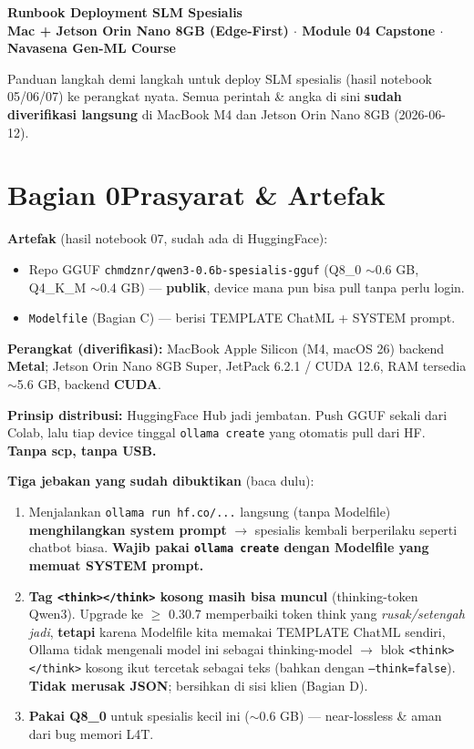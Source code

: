 \documentclass[11pt,a4paper]{article}
\begin{document}
\thispagestyle{fancy}

\noindent\begin{tcolorbox}[colback=nvgreen,colframe=nvgreen,arc=4pt,left=12pt,right=12pt,top=8pt,bottom=8pt]
\color{white}\LARGE\bfseries Runbook Deployment SLM Spesialis\\[3pt]
\normalsize\mdseries Mac + Jetson Orin Nano 8GB (Edge-First) $\cdot$ Module 04 Capstone $\cdot$ Navasena Gen-ML Course
\end{tcolorbox}

\vspace{4pt}
\noindent Panduan langkah demi langkah untuk deploy SLM spesialis (hasil notebook 05/06/07) ke perangkat nyata. Semua perintah \& angka di sini \textbf{sudah diverifikasi langsung} di MacBook M4 dan Jetson Orin Nano 8GB (2026-06-12).

\section*{\color{nvgreen}Bagian 0\quad Prasyarat \& Artefak}
\textbf{Artefak} (hasil notebook 07, sudah ada di HuggingFace):
\begin{itemize}
  \item Repo GGUF \texttt{chmdznr/qwen3-0.6b-spesialis-gguf} (Q8\_0 $\sim$0.6 GB, Q4\_K\_M $\sim$0.4 GB) --- \textbf{publik}, device mana pun bisa pull tanpa perlu login.
  \item \texttt{Modelfile} (Bagian C) --- berisi TEMPLATE ChatML + SYSTEM prompt.
\end{itemize}
\textbf{Perangkat (diverifikasi):} MacBook Apple Silicon (M4, macOS 26) backend \textbf{Metal}; Jetson Orin Nano 8GB Super, JetPack 6.2.1 / CUDA 12.6, RAM tersedia $\sim$5.6 GB, backend \textbf{CUDA}.

\textbf{Prinsip distribusi:} HuggingFace Hub jadi jembatan. Push GGUF sekali dari Colab, lalu tiap device tinggal \texttt{ollama create} yang otomatis pull dari HF. \textbf{Tanpa scp, tanpa USB.}

\begin{warn}
\textbf{Tiga jebakan yang sudah dibuktikan} (baca dulu):
\begin{enumerate}[leftmargin=1.6em]
  \item Menjalankan \texttt{ollama run hf.co/...} langsung (tanpa Modelfile) \textbf{menghilangkan system prompt} $\to$ spesialis kembali berperilaku seperti chatbot biasa. \textbf{Wajib pakai \texttt{ollama create} dengan Modelfile yang memuat SYSTEM prompt.}
  \item \textbf{Tag \texttt{<think></think>} kosong masih bisa muncul} (thinking-token Qwen3). Upgrade ke $\geq$ 0.30.7 memperbaiki token think yang \emph{rusak/setengah jadi}, \textbf{tetapi} karena Modelfile kita memakai TEMPLATE ChatML sendiri, Ollama tidak mengenali model ini sebagai thinking-model $\to$ blok \texttt{<think></think>} kosong ikut tercetak sebagai teks (bahkan dengan \texttt{--think=false}). \textbf{Tidak merusak JSON}; bersihkan di sisi klien (Bagian D).
  \item \textbf{Pakai Q8\_0} untuk spesialis kecil ini ($\sim$0.6 GB) --- near-lossless \& aman dari bug memori L4T.
\end{enumerate}
\end{warn}
\end{document}

